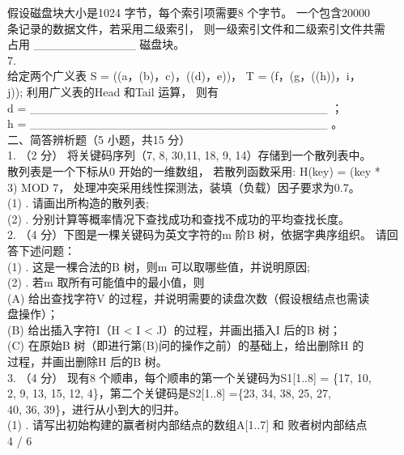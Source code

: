 \begin{question}
假设磁盘块大小是1024 字节，每个索引项需要8 个字节。 一个包含20000\\
条记录的数据文件，若采用二级索引， 则一级索引文件和二级索引文件共需\\
占用 \_\_\_\_\_\_\_\_\_\_\_\_ 磁盘块。\\
7.\\
给定两个广义表 S = ((a，(b)，c)，((d)，e))， T = (f，(g，((h))，i，\\
j)); 利用广义表的Head 和Tail 运算， 则有\\
d = \_\_\_\_\_\_\_\_\_\_\_\_\_\_\_\_\_\_\_\_\_\_\_\_\_\_\_\_\_\_\_\_\_\_\_ ；\\
h = \_\_\_\_\_\_\_\_\_\_\_\_\_\_\_\_\_\_\_\_\_\_\_\_\_\_\_\_\_\_\_\_\_\_\_ 。\\
二、简答辨析题（5 小题，共15 分）\\
1. （2 分） 将关键码序列（7, 8, 30,11, 18, 9, 14）存储到一个散列表中。\\
散列表是一个下标从0 开始的一维数组， 若散列函数采用: H(key) = (key *\\
3) MOD 7， 处理冲突采用线性探测法，装填（负载）因子要求为0.7。\\
(1) . 请画出所构造的散列表;\\
(2) . 分别计算等概率情况下查找成功和查找不成功的平均查找长度。\\
2. （4 分）下图是一棵关键码为英文字符的m 阶B 树，依据字典序组织。 请回\\
答下述问题：\\
(1) . 这是一棵合法的B 树，则m 可以取哪些值，并说明原因;\\
(2) . 若m 取所有可能值中的最小值，则\\
(A) 给出查找字符V 的过程，并说明需要的读盘次数（假设根结点也需读\\
盘操作）；\\
(B) 给出插入字符I（H < I < J）的过程，并画出插入I 后的B 树；\\
(C) 在原始B 树（即进行第(B)问的操作之前）的基础上，给出删除H 的\\
过程，并画出删除H 后的B 树。\\
3. （4 分） 现有8 个顺串，每个顺串的第一个关键码为S1[1..8] = \{17, 10,\\
2, 9, 13, 15, 12, 4\}，第二个关键码是S2[1..8] =\{23, 34, 38, 25, 27,\\
40, 36, 39\}，进行从小到大的归并。\\
(1) . 请写出初始构建的赢者树内部结点的数组A[1..7] 和 败者树内部结点\\
4 / 6\\

\end{question}
